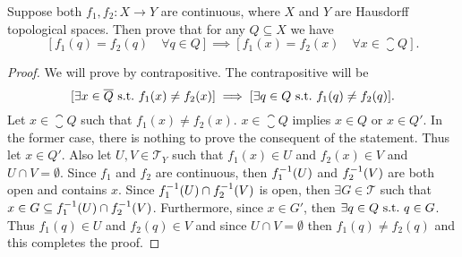 \begin{problem}
	Suppose both $f_1, f_2: X\to Y$ are continuous, where $X$ and $Y$ are Hausdorff topological spaces. Then prove that for any $Q \subseteq X$ we have
	\[ [f_1(q) = f_2(q) \quad \forall q\in Q ] \implies [f_1(x) = f_2(x) \quad \forall x\in\closure{Q}].\]
\end{problem}
\begin{proof}
	We will prove by contrapositive. The contrapositive will be
	\[ [\exists x \in \overline{Q} \ \text{s.t.}\  f_1(x) \neq f_2(x)] \implies [\exists q \in Q \ \text{s.t.}\  f_1(q) \neq f_2(q)].  \]
	Let $x\in \closure{Q}$ such that $f_1(x) \neq f_2(x)$. $x \in \closure{Q}$ implies $x \in Q$ or $x\in Q'$. In the former case, there is nothing to prove the consequent of the statement. Thus let $x \in Q'$. Also let $U,V \in \mathcal{T}_Y$ such that $f_1(x)\in U$ and $f_2(x) \in V$ and $U\cap V = \emptyset$. Since $f_1$ and $f_2$ are continuous, then $f_1^{-1}(U)$ and $f_2^{-1}(V)$ are both open and contains $x$. Since $f_1^{-1}(U) \cap f_2^{-1}(V)$ is open, then $\exists G \in \mathcal{T}$ such that $x \in G \subseteq f_1^{-1}(U) \cap f_2^{-1}(V)$. Furthermore, since $x \in G'$, then $\exists q \in Q \ \text{s.t.}\  q \in G$. Thus $f_1(q) \in U$ and $f_2(q) \in V$ and since $U \cap V = \emptyset$ then $f_1(q) \neq f_2(q)$ and this completes the proof.
\end{proof}
